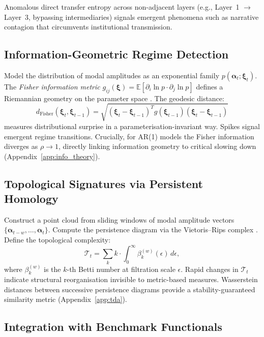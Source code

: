 \documentclass[11pt,a4paper]{article}
\theoremstyle{definition}
\newcommand{\E}{\mathbb{E}}
\newcommand{\balpha}{\bm{\alpha}}
\begin{document}
Anomalous direct transfer entropy across non-adjacent layers (e.g., Layer~1 $\to$ Layer~3, bypassing intermediaries) signals emergent phenomena such as narrative contagion that circumvents institutional transmission.

\subsection{Information-Geometric Regime Detection}
\label{sec:info_geometry}

Model the distribution of modal amplitudes as an exponential family $p(\balpha_t; \bm{\xi}_t)$. The \emph{Fisher information metric} $g_{ij}(\bm{\xi}) = \E[\partial_i \ln p \cdot \partial_j \ln p]$ defines a Riemannian geometry on the parameter space \citep{amari2016information}. The geodesic distance:
\begin{equation}
  d_{\mathrm{Fisher}}(\bm{\xi}_t, \bm{\xi}_{t-1}) = \sqrt{(\bm{\xi}_t - \bm{\xi}_{t-1})^T g(\bm{\xi}_{t-1})(\bm{\xi}_t - \bm{\xi}_{t-1})}
  \label{eq:fisher_dist}
\end{equation}
measures distributional surprise in a parameterisation-invariant way. Spikes signal emergent regime transitions. Crucially, for AR(1) models the Fisher information diverges as $\rho \to 1$, directly linking information geometry to critical slowing down (Appendix~\ref{app:info_theory}).

\subsection{Topological Signatures via Persistent Homology}
\label{sec:topology}

Construct a point cloud from sliding windows of modal amplitude vectors $\{\balpha_{t-w}, \ldots, \balpha_t\}$. Compute the persistence diagram via the Vietoris--Rips complex \citep{carlsson2009topology,edelsbrunner2010computational}. Define the topological complexity:
\begin{equation}
  \mathcal{T}_t = \sum_k k \cdot \int_0^\infty \beta_k^{(w)}(\epsilon)\,d\epsilon,
  \label{eq:topo}
\end{equation}
where $\beta_k^{(w)}$ is the $k$-th Betti number at filtration scale $\epsilon$. Rapid changes in $\mathcal{T}_t$ indicate structural reorganisation invisible to metric-based measures. Wasserstein distances between successive persistence diagrams provide a stability-guaranteed similarity metric (Appendix~\ref{app:tda}).

\subsection{Integration with Benchmark Functionals}
\label{sec:emergence_integration}
\end{document}
